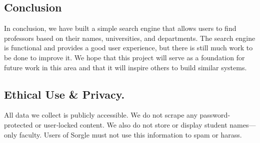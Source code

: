 \subsection{Conclusion}

In conclusion, we have built a simple search engine that allows users to find professors based on their names, universities, and departments. The search engine is functional and provides a good user experience, but there is still much work to be done to improve it. We hope that this project will serve as a foundation for future work in this area and that it will inspire others to build similar systems.

\subsection{Ethical Use \& Privacy.}

All data we collect is publicly accessible. We do not scrape any password‐protected or user‐locked content. We also do not store or display student names—only faculty. Users of Sorgle must not use this information to spam or harass.
